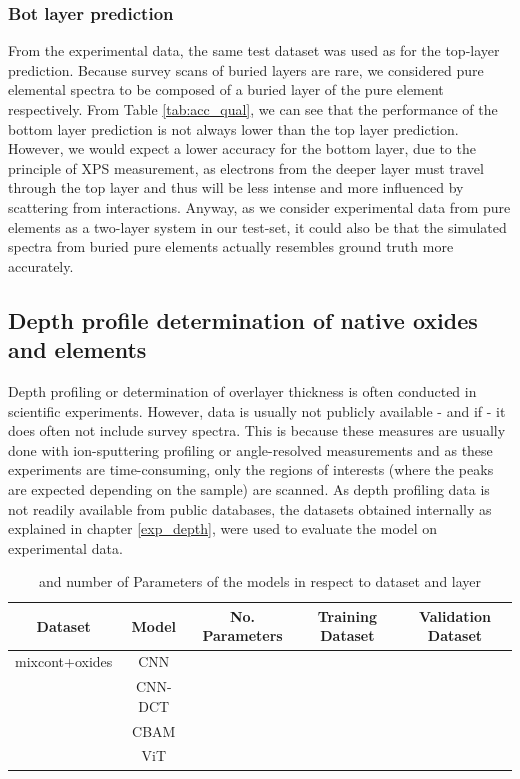 \subsubsection{Bot layer prediction}


From the experimental data, the same test dataset was used as for the top-layer prediction. Because survey scans of buried layers are rare, we considered pure elemental spectra to be composed of a buried layer of the pure element respectively.
From Table \ref{tab:acc_qual}, we can see that the performance of the bottom layer prediction is not always lower than the top layer prediction. However, we would expect a lower accuracy for the bottom layer, due to the principle of XPS measurement, as electrons from the deeper layer must travel through the top layer and thus will be less intense and more influenced by scattering from interactions. Anyway, as we consider experimental data from pure elements as a two-layer system in our test-set, it could also be that the simulated spectra from buried pure elements actually resembles ground truth more accurately.




\subsection{Depth profile determination of native oxides and elements}

Depth profiling or determination of overlayer thickness is often conducted in scientific experiments. However, data is usually not publicly available - and if - it does often not include survey spectra. This is because these measures are usually done with ion-sputtering profiling or angle-resolved measurements and as these experiments are time-consuming, only the regions of interests (where the peaks are expected depending on the sample) are scanned.
As depth profiling data is not readily available from public databases, the datasets obtained internally as explained in chapter \ref{exp_depth}, were used to evaluate the model on experimental data.

\begin{table}[H]
    \centering
    \begin{tabular}{c|c|c|c|c}
        Dataset & Model   & No. Parameters & Training Dataset    & Validation Dataset    \\
        \hline
 mixcont+oxides& CNN     &                &                       &                         \\
               & CNN-DCT &                &                       &                         \\
               & CBAM    &                &                       &                         \\
               & ViT     &                &                       &                         \\

    \end{tabular}
    \caption{ and number of Parameters of the models in respect to dataset and layer}
    \label{tab:acc_depth}
\end{table}



